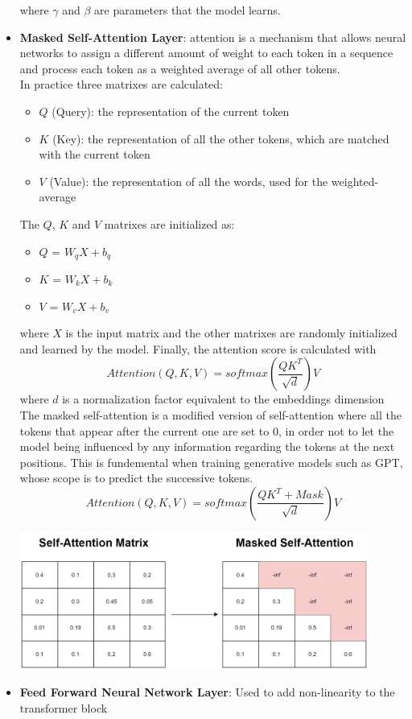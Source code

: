 \begin{itemize}
    where $\gamma$ and $\beta$ are parameters that the model learns.
    \item \textbf{Masked Self-Attention Layer}: attention is a mechanism that allows neural networks to assign a different amount of weight to each token in a sequence and process each token as a weighted average of all other tokens. \\
    In practice three matrixes are calculated:
    \begin{itemize}
        \item $Q$ (Query): the representation of the current token
        \item $K$ (Key): the representation of all the other tokens, which are matched with the current token
        \item $V$ (Value): the representation of all the words, used for the weighted-average
    \end{itemize}
    The $Q$, $K$ and $V$ matrixes are initialized as:
    \begin{itemize}
        \item $Q$ = $W_qX + b_q$ 
        \item $K$ = $W_kX + b_k$ 
        \item $V$ = $W_vX + b_v$
    \end{itemize}
    where $X$ is the input matrix and the other matrixes are randomly initialized and learned by the model.
    Finally, the attention score is calculated with
    \begin{equation*}
        Attention(Q,K,V) = softmax \left(\frac{QK^T}{\sqrt{d}}\right)V
    \end{equation*}
    where $d$ is a normalization factor equivalent to the embeddings dimension \\
    The masked self-attention is a modified version of self-attention where all the tokens that appear after the current one are set to $0$, in order not to let the model being influenced by any information regarding the tokens at the next positions. This is fundemental when training generative models such as GPT, whose scope is to predict the successive tokens.
    \begin{equation*}
        Attention(Q,K,V) = softmax\left(\frac{QK^T + Mask}{\sqrt{d}}\right)V
    \end{equation*}

    \includegraphics[width=0.90\textwidth]{images/masked_self_attention.drawio.png}

    \item \textbf{Feed Forward Neural Network Layer}: Used to add non-linearity to the transformer block
\end{itemize}

